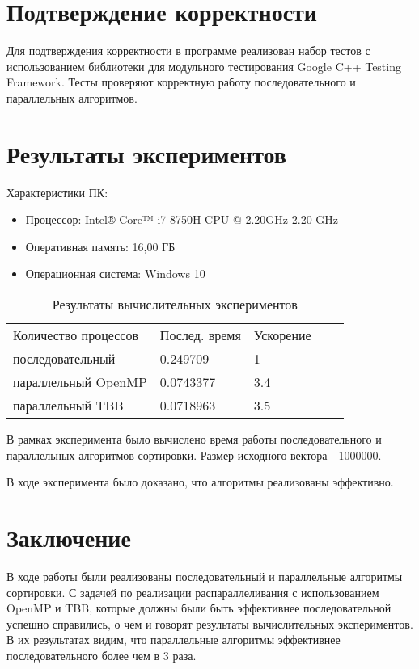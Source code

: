 \documentclass{report}
\begin{document}
\section*{Подтверждение корректности}
Для подтверждения корректности в программе реализован набор тестов с использованием библиотеки для модульного тестирования Google C++ Testing Framework. Тесты проверяют корректную работу последовательного и параллельных алгоритмов.
\newpage
\section*{Результаты экспериментов}
Характеристики ПК:
\begin{itemize}
    \item Процессор: Intel® Core™ i7-8750H CPU @ 2.20GHz 2.20 GHz
\end{itemize}
\begin{itemize}
    \item Оперативная память: 16,00 ГБ
\end{itemize}
\begin{itemize}
    \item Операционная система: Windows 10
\end{itemize}
\begin{table}[!h]
\caption{Результаты вычислительных экспериментов}
\centering
\begin{tabular}{lllll}
Количество процессов & Послед. время & Ускорение\\
последовательный & 0.249709 & 1\\
параллельный OpenMP & 0.0743377 & 3.4\\
параллельный TBB  & 0.0718963 & 3.5\\
\end{tabular}
\end{table}
\par
В рамках эксперимента было вычислено время работы последовательного и параллельных алгоритмов сортировки. Размер исходного вектора - 1000000.
\par
В ходе эксперимента было доказано, что алгоритмы реализованы эффективно.
\newpage

\section*{Заключение}
В ходе работы были реализованы последовательный и параллельные алгоритмы сортировки. С задачей по реализации распараллеливания с использованием OpenMP и TBB, которые должны были быть эффективнее последовательной успешно справились, о чем и говорят результаты вычислительных экспериментов. В их результатах видим, что параллельные алгоритмы эффективнее последовательного более чем в 3 раза.
\newpage
\end{document}

